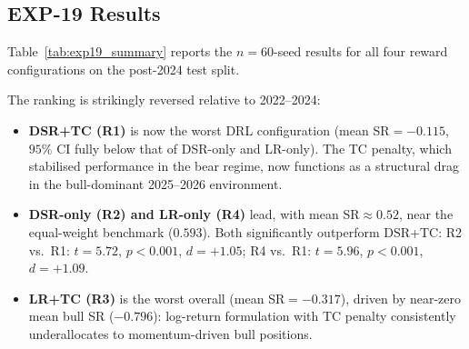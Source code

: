 \documentclass[conference]{IEEEtran}
\begin{document}
\subsection{EXP-19 Results}

Table~\ref{tab:exp19_summary} reports the $n=60$-seed results
for all four reward configurations on the post-2024 test split.

\begin{table}[t]
\centering
\caption{EXP-19: Post-2024 out-of-sample comparison, all reward
configurations (real S\&P~500, 2025-01-03 to 2026-04-02,
$n=60$ seeds).}
\label{tab:exp19_summary}
\end{table}

The ranking is strikingly reversed relative to 2022--2024:
\begin{itemize}
  \item \textbf{DSR+TC (R1)} is now the worst DRL configuration
    (mean SR$=-0.115$, $95\%$ CI fully below that of DSR-only
    and LR-only). The TC penalty, which stabilised performance
    in the bear regime, now functions as a structural
    drag in the bull-dominant 2025--2026 environment.
  \item \textbf{DSR-only (R2) and LR-only (R4)} lead, with
    mean SR$\approx 0.52$, near the equal-weight benchmark
    ($0.593$). Both significantly outperform DSR+TC:
    R2 vs.\ R1: $t=5.72$, $p<0.001$, $d=+1.05$;
    R4 vs.\ R1: $t=5.96$, $p<0.001$, $d=+1.09$.
  \item \textbf{LR+TC (R3)} is the worst overall
    (mean SR$=-0.317$), driven by near-zero mean bull SR
    ($-0.796$): log-return formulation with TC penalty
    consistently underallocates to momentum-driven bull
    positions.
\end{itemize}
\end{document}
